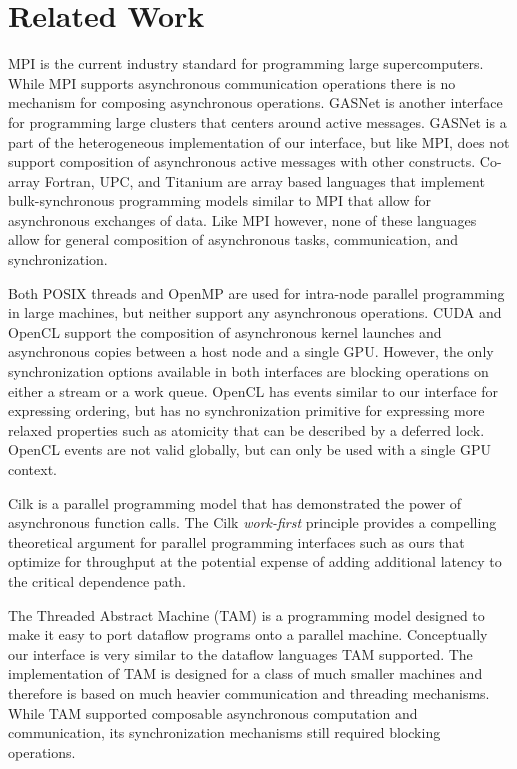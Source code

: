 
\section{Related Work}
\label{sec:related}

MPI is the current industry standard for programming large
supercomputers\cite{MPI}.  While MPI supports asynchronous
communication operations there is no mechanism for composing
asynchronous operations.  GASNet is another interface for programming
large clusters that centers around active messages\cite{GASNET07}.  GASNet
is a part of the heterogeneous implementation of our interface, but like
MPI, does not support composition of asynchronous active messages with
other constructs.  Co-array Fortran, UPC, and Titanium
are array based languages that implement bulk-synchronous
programming models similar to MPI that allow for asynchronous
exchanges of data\cite{COARRAY_FORTRAN,UPC99,JV:Yel98}.  Like
MPI however, none of these languages allow for general composition
of asynchronous tasks, communication, and synchronization.

Both POSIX threads and OpenMP\cite{OPENMP98} are used for intra-node parallel
programming in large machines, but neither support any asynchronous
operations.  CUDA\cite{CUDA} and OpenCL\cite{Khronos:OpenCL} support
the composition of asynchronous kernel launches and asynchronous copies
between a host node and a single GPU.  However, the only synchronization
options available in both interfaces are blocking operations on either
a stream or a work queue.  OpenCL has events similar to our interface for
expressing ordering, but has no synchronization primitive for expressing
more relaxed properties such as atomicity that can be described by a
deferred lock.  OpenCL events are not valid globally, but can only be
used with a single GPU context.

Cilk is a parallel programming model that has demonstrated the power of
asynchronous function calls\cite{CILK95}.  The Cilk {\em work-first}
principle provides a compelling theoretical argument for parallel programming
interfaces such as ours that optimize for throughput at the potential
expense of adding additional latency to the critical 
dependence path\cite{Frigo98}.

The Threaded Abstract Machine (TAM) is a programming model designed to
make it easy to port dataflow programs onto a parallel machine\cite{CullerGSvE93}.  
Conceptually our interface is very similar to the dataflow languages TAM supported.
The implementation of TAM is designed for a class of much smaller machines
and therefore is based on much heavier communication and threading mechanisms.
While TAM supported composable asynchronous computation and communication, its
synchronization mechanisms still required blocking operations.

